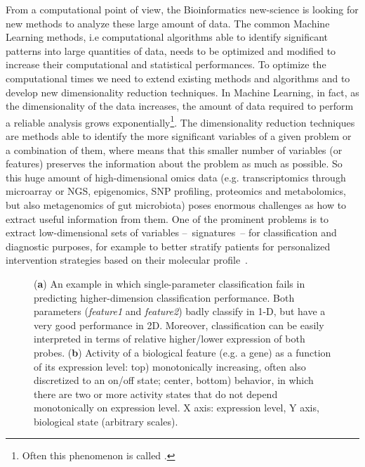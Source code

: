\documentclass{standalone}
\begin{document}
From a computational point of view, the Bioinformatics new-science is looking for new methods to analyze these large amount of data.
The common Machine Learning methods, i.e computational algorithms able to identify significant patterns into large quantities of data, needs to be optimized and modified to increase their computational and statistical performances.
To optimize the computational times we need to extend existing methods and algorithms and to develop new dimensionality reduction techniques.
In Machine Learning, in fact, as the dimensionality of the data increases, the amount of data required to perform a reliable analysis grows exponentially\footnote{Often this phenomenon is called .}.
The dimensionality reduction techniques are methods able to identify the more significant variables of a given problem or a combination of them, where  means that this smaller number of variables (or features) preserves the information about the problem as much as possible.
So this huge amount of high-dimensional omics data (e.g. transcriptomics through microarray or NGS, epigenomics, SNP profiling, proteomics and metabolomics, but also metagenomics of gut microbiota) poses enormous challenges as how to extract useful information from them.
One of the prominent problems is to extract low-dimensional sets of variables –~signatures~– for classification and diagnostic purposes, for example to better stratify patients for personalized intervention strategies based on their molecular profile~\cite{Scotlandi2009, Chan2011, Johnson2017, Beckmann2016ReconcilingEM}.


\begin{figure}[htbp]
\centering
\def\svgwidth{0.4\textwidth}

\qquad\qquad
\def\svgwidth{0.4\textwidth}

\caption{(\textbf{a}) An example in which single-parameter classification fails in predicting higher-dimension classification performance.
Both parameters (\emph{feature1} and \emph{feature2}) badly classify in 1-D, but have a very good performance in 2D.
Moreover, classification can be easily interpreted in terms of relative higher/lower expression of both probes.
(\textbf{b}) Activity of a biological feature (e.g. a gene) as a function of its expression level:
top) monotonically increasing, often also discretized to an on/off state;
center, bottom)  behavior, in which there are two or more activity states that do not depend monotonically on expression level.
X axis: expression level, Y axis, biological state (arbitrary scales).
}
\label{example}
\end{figure}
\end{document}
